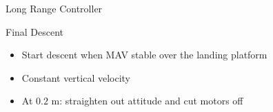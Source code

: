 \begin{frame}{Long Range Controller}
\begin{frame}{Final Descent}
		\begin{center}
		\end{center}
\begin{itemize}
	\item Start descent when MAV stable over the landing platform 
	\item Constant vertical velocity %
	\item At $0.2$ m: straighten out attitude and cut motors off
\end{itemize}
\end{frame}





\end{frame}
